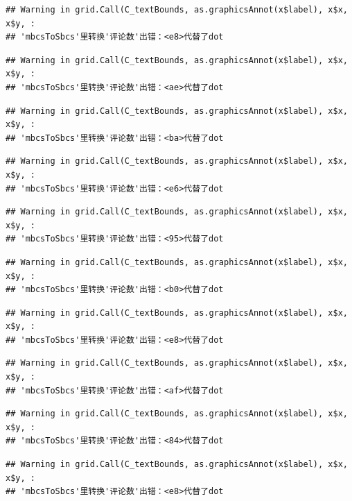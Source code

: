 \documentclass[
]{article}
\begin{document}
\begin{verbatim}
## Warning in grid.Call(C_textBounds, as.graphicsAnnot(x$label), x$x, x$y, :
## 'mbcsToSbcs'里转换'评论数'出错：<e8>代替了dot
\end{verbatim}

\begin{verbatim}
## Warning in grid.Call(C_textBounds, as.graphicsAnnot(x$label), x$x, x$y, :
## 'mbcsToSbcs'里转换'评论数'出错：<ae>代替了dot
\end{verbatim}

\begin{verbatim}
## Warning in grid.Call(C_textBounds, as.graphicsAnnot(x$label), x$x, x$y, :
## 'mbcsToSbcs'里转换'评论数'出错：<ba>代替了dot
\end{verbatim}

\begin{verbatim}
## Warning in grid.Call(C_textBounds, as.graphicsAnnot(x$label), x$x, x$y, :
## 'mbcsToSbcs'里转换'评论数'出错：<e6>代替了dot
\end{verbatim}

\begin{verbatim}
## Warning in grid.Call(C_textBounds, as.graphicsAnnot(x$label), x$x, x$y, :
## 'mbcsToSbcs'里转换'评论数'出错：<95>代替了dot
\end{verbatim}

\begin{verbatim}
## Warning in grid.Call(C_textBounds, as.graphicsAnnot(x$label), x$x, x$y, :
## 'mbcsToSbcs'里转换'评论数'出错：<b0>代替了dot
\end{verbatim}

\begin{verbatim}
## Warning in grid.Call(C_textBounds, as.graphicsAnnot(x$label), x$x, x$y, :
## 'mbcsToSbcs'里转换'评论数'出错：<e8>代替了dot
\end{verbatim}

\begin{verbatim}
## Warning in grid.Call(C_textBounds, as.graphicsAnnot(x$label), x$x, x$y, :
## 'mbcsToSbcs'里转换'评论数'出错：<af>代替了dot
\end{verbatim}

\begin{verbatim}
## Warning in grid.Call(C_textBounds, as.graphicsAnnot(x$label), x$x, x$y, :
## 'mbcsToSbcs'里转换'评论数'出错：<84>代替了dot
\end{verbatim}

\begin{verbatim}
## Warning in grid.Call(C_textBounds, as.graphicsAnnot(x$label), x$x, x$y, :
## 'mbcsToSbcs'里转换'评论数'出错：<e8>代替了dot
\end{verbatim}
\end{document}
